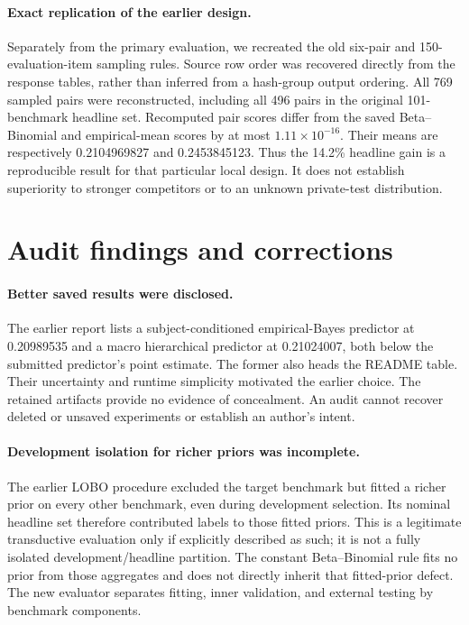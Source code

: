 \documentclass{article}
\begin{document}
\paragraph{Exact replication of the earlier design.}
Separately from the primary evaluation, we recreated the old six-pair and
150-evaluation-item sampling rules. Source row order was recovered directly
from the response tables, rather than inferred from a hash-group output
ordering. All 769 sampled pairs were reconstructed, including all 496 pairs
in the original 101-benchmark headline set. Recomputed pair scores differ
from the saved Beta--Binomial and empirical-mean scores by at most
$1.11\times10^{-16}$. Their means are respectively 0.2104969827 and
0.2453845123. Thus the 14.2\% headline gain is a reproducible result for
that particular local design. It does not establish superiority to stronger
competitors or to an unknown private-test distribution.

\section{Audit findings and corrections}
\paragraph{Better saved results were disclosed.}
The earlier report lists a subject-conditioned empirical-Bayes predictor at
0.20989535 and a macro hierarchical predictor at 0.21024007, both below the
submitted predictor's point estimate. The former also heads the README table.
Their uncertainty and runtime simplicity motivated the earlier choice.
The retained artifacts provide no evidence of concealment. An audit cannot
recover deleted or unsaved experiments or establish an author's intent.

\paragraph{Development isolation for richer priors was incomplete.}
The earlier LOBO procedure excluded the target benchmark but fitted a richer
prior on every other benchmark, even during development selection. Its
nominal headline set therefore contributed labels to those fitted priors.
This is a legitimate transductive evaluation only if explicitly described
as such; it is not a fully isolated development/headline partition. The
constant Beta--Binomial rule fits no prior from those aggregates and does
not directly inherit that fitted-prior defect. The new evaluator separates
fitting, inner validation, and external testing by benchmark components.
\end{document}
